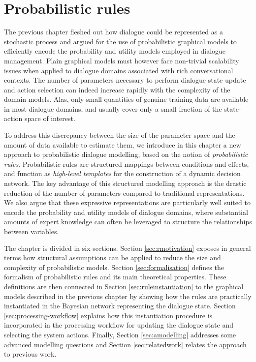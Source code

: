 \chapter{Probabilistic rules}
\label{chap:rules}

The previous chapter fleshed out how dialogue could be represented as a stochastic process and argued for the use of probabilistic graphical models to efficiently encode the probability and utility models employed in dialogue management. Plain graphical models must however face non-trivial scalability issues when applied to dialogue domains associated with rich conversational contexts. The number of parameters necessary to perform dialogue state update and action selection can indeed increase rapidly with the complexity of the domain models. Alas, only small quantities of genuine training data are available in most dialogue domains, and usually cover only a small fraction of the state-action space of interest. 

To address this discrepancy between the size of the parameter space and the amount of data available to estimate them, we introduce in this chapter a new approach to probabilistic dialogue modelling, based on the notion of \textit{probabilistic rules}.  Probabilistic rules are structured mappings between conditions and effects, and function as \textit{high-level templates} for the construction of a dynamic decision network.  The key advantage of this structured modelling approach is the drastic reduction of the number of parameters compared to traditional representations.  We also argue that these expressive representations are particularly well suited to encode the probability and utility models of dialogue domains, where substantial amounts of expert knowledge can often be leveraged to structure the relationships between variables. 

The chapter is divided in six sections. Section \ref{sec:rmotivation} exposes in general terms how structural assumptions can be applied to reduce the size and complexity of probabilistic models.  Section \ref{sec:formalisation} defines the formalism of probabilistic rules and its main theoretical properties.  These definitions are then connected in Section \ref{sec:ruleinstantiation} to the graphical models described in the previous chapter by showing how the rules are practically instantiated in the Bayesian network representing the dialogue state. Section \ref{sec:processing-workflow} explains how this instantiation procedure is incorporated in the processing workflow for updating the dialogue state and selecting the system actions. Finally, Section \ref{sec:amodelling} addresses some advanced modelling questions and Section \ref{sec:relatedwork} relates the approach to previous work.


